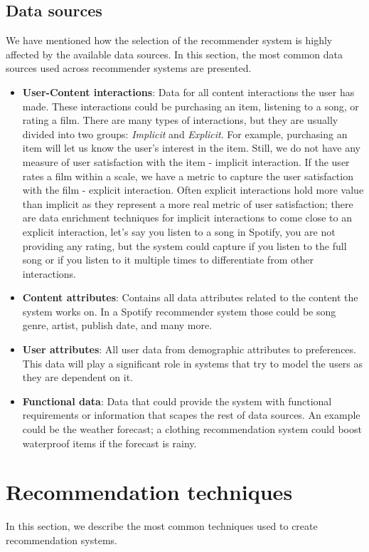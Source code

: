 \documentclass{kththesis}
\begin{document}
\subsection{Data sources}

We have mentioned how the selection of the recommender system is highly affected by the available data sources. In this section, the most common data sources used across recommender systems are presented.

\begin{itemize}
    \item \textbf{User-Content interactions}: Data for all content interactions the user has made. These interactions could be purchasing an item, listening to a song, or rating a film. There are many types of interactions, but they are usually divided into two groups: \textit{Implicit} and \textit{Explicit}. For example, purchasing an item will let us know the user's interest in the item. Still, we do not have any measure of user satisfaction with the item - implicit interaction. If the user rates a film within a scale, we have a metric to capture the user satisfaction with the film - explicit interaction. Often explicit interactions hold more value than implicit as they represent a more real metric of user satisfaction; there are data enrichment techniques for implicit interactions to come close to an explicit interaction, let's say you listen to a song in Spotify, you are not providing any rating, but the system could capture if you listen to the full song or if you listen to it multiple times to differentiate from other interactions.
    \item \textbf{Content attributes}: Contains all data attributes related to the content the system works on. In a Spotify recommender system those could be song genre, artist, publish date, and many more.
    \item \textbf{User attributes}: All user data from demographic attributes to preferences. This data will play a significant role in systems that try to model the users as they are dependent on it. 
    \item \textbf{Functional data}: Data that could provide the system with functional requirements or information that scapes the rest of data sources. An example could be the weather forecast; a clothing recommendation system could boost waterproof items if the forecast is rainy.
\end{itemize}

\section{Recommendation techniques}
In this section, we describe the most common techniques used to create recommendation systems.
\end{document}
